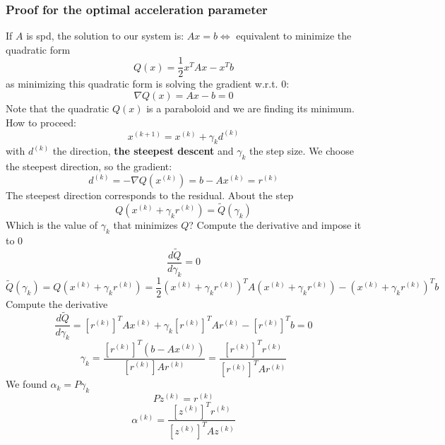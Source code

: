     \subsubsection{Proof for the optimal acceleration parameter}
    If $A$ is spd, the solution to our system is: $Ax=b\Leftrightarrow$ equivalent to minimize the quadratic form
    $$Q(x)=\frac{1}{2}x^TAx-x^Tb$$
    as minimizing this quadratic form is solving the gradient w.r.t. 0:
    $$
    \nabla Q(x)=Ax-b=0
    $$
    Note that the quadratic $Q(x)$ is a paraboloid and we are finding its minimum. How to proceed:
    $$
    x^{(k+1)}=x^{(k)}+\gamma_kd^{(k)}
    $$
    with $d^{(k)}$ the direction, \textbf{the steepest descent} and $\gamma_k$ the step size. We choose the steepest direction, so the gradient:
    $$
    d^{(k)}=-\nabla Q(x^{(k)})=b-Ax^{(k)}=r^{(k)}
    $$
    The steepest direction corresponds to the residual. About the step
    $$
    Q\left(
        x^{(k)}+\gamma_kr^{(k)}
    \right)=\tilde{Q}(\gamma_k)
    $$
    Which is the value of $\gamma_k$ that minimizes $Q$? Compute the derivative and impose it to 0
    $$
    \frac{
        d\tilde{Q}
    }{
        d\gamma_k
    }=0
    $$
    $$
    \tilde{Q}(\gamma_k)=Q\left(
        x^{(k)}+\gamma_kr^{(k)}
    \right)=\frac{1}{2}
    \left(
        x^{(k)}+\gamma_kr^{(k)}
    \right)^TA
    \left(
        x^{(k)}+\gamma_kr^{(k)}
    \right)-
    \left(
        x^{(k)}+\gamma_kr^{(k)}
    \right)^Tb
    $$
    Compute the derivative
    $$
    \frac{
        d\tilde{Q}
    }{
        d\gamma_k
    }=
    \left[r^{(k)}\right]^TAx^{(k)}+
    \gamma_k\left[r^{(k)}\right]^TAr^{(k)}-
    \left[r^{(k)}\right]^Tb
    =0
    $$
    $$
    \gamma_k=
    \frac{
        \left[r^{(k)}\right]^T\left(b-Ax^{(k)}\right)
    }{
        \left[r^{(k)}\right]Ar^{(k)}
    }=
    \frac{
        \left[r^{(k)}\right]^Tr^{(k)}
    }{
        \left[r^{(k)}\right]^TAr^{(k)}
    }
    $$
    We found $\alpha_k=P\gamma_k$
    $$
    Pz^{(k)}=r^{(k)}
    $$
    $$
    \alpha^{(k)}=\frac{
        \left[z^{(k)}\right]^Tr^{(k)}
    }{
        \left[z^{(k)}\right]^TAz^{(k)}
    }
    $$

